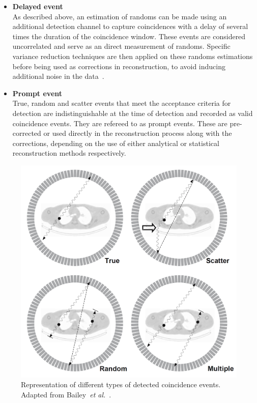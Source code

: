 \begin{itemize}
\item\textbf{Delayed event}\\
As described above, an estimation of randoms can be made using an additional detection channel to capture coincidences with a delay of several times the duration of the coincidence window. These events are considered uncorrelated and serve as an direct measurement of randoms. Specific variance reduction techniques are then applied on these randoms estimations before being used as corrections in reconstruction, to avoid inducing additional noise in the data~\cite{Bailey2005}.

\item\textbf{Prompt event}\\
True, random and scatter events that meet the acceptance criteria for detection are indistinguishable at the time of detection and recorded as valid coincidence events. They are refereed to as prompt events.
These are pre-corrected or used directly in the reconstruction process along with the corrections, depending on the use of either analytical or statistical reconstruction methods respectively.
\end{itemize}
%
\begin{figure} [h!]
\centering
\includegraphics[scale=0.22,angle=0]{2_Theory_Methods/figures/Bailey_Scatter_Random_events.png}
\caption{Representation of different types of detected coincidence events. Adapted from Bailey~\textit{et al.}~\cite{Bailey2005}.} 
\label{fig_2:EventsIlustration}
\end{figure} 
%
%
